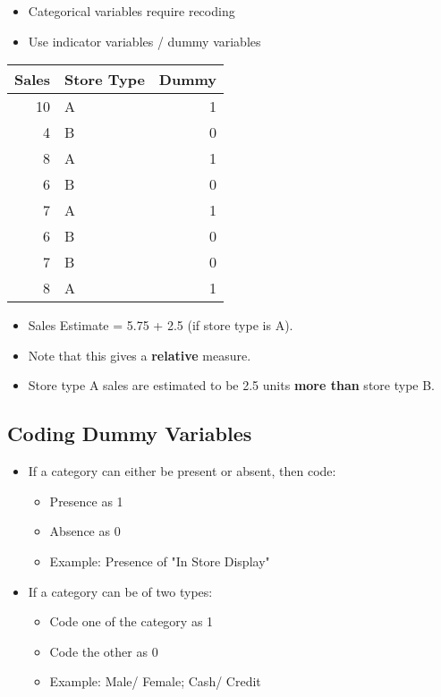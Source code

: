 \documentclass[10pt,article]{article}
\begin{document}
\begin{itemize}
\item Categorical variables require recoding
\item Use indicator variables / dummy variables
\end{itemize}

{\small
\begin{center}
\begin{tabular}{rlr}
Sales & Store Type & Dummy\\
\hline
10 & A & 1\\
4 & B & 0\\
8 & A & 1\\
6 & B & 0\\
7 & A & 1\\
6 & B & 0\\
7 & B & 0\\
8 & A & 1\\
\end{tabular}
\end{center}
}
\begin{itemize}
\item Sales Estimate = 5.75 + 2.5 \texttimes{} (if store type is A).
\item Note that this gives a  {\bf relative} measure.
\item Store type A sales are estimated to be 2.5 units  {\bf more than} store type B.
\end{itemize}
\subsection{Coding Dummy Variables}
\label{sec:org65a1c06}
\begin{itemize}
\item If a category can either be present or absent, then code:
\begin{itemize}
\item Presence as 1
\item Absence as 0
\item Example: Presence of "In Store Display"
\end{itemize}
\item If a category can be of two types:
\begin{itemize}
\item Code one of the category as 1
\item Code the other as 0
\item Example: Male/ Female; Cash/ Credit
\end{itemize}
\end{itemize}
\end{document}
